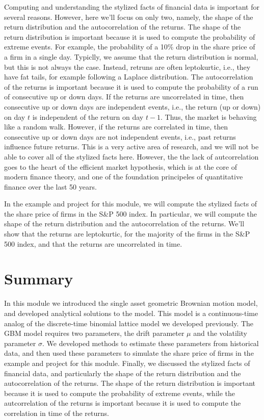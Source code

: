 \documentclass[11pt]{article}
\theoremstyle{definition}
\begin{document}
Computing and understanding the stylized facts of financial data is important for several reasons. 
However, here we'll focus on only two, namely, the shape of the return distribution and the autocorrelation of the returns.
The shape of the return distribution is important because it is used to compute the probability of extreme events.
For example, the probability of a 10\% drop in the share price of a firm in a single day. 
Typiclly, we assume that the return distribution is normal, but this is not always the case. 
Instead, retruns are often leptokurtic, i.e., they have fat tails, for example following a Laplace distribution.
The autocorrelation of the returns is important because it is used to compute the probability of a run of consecutive up or down days.
If the returns are uncorrelated in time, then consecutive up or down days are independent events, i.e., 
the return (up or down) on day $t$ is independent of the return on day $t-1$. Thus, the market is behaving like a random walk.
However, if the returns are correlated in time, then consecutive up or down days are not independent events, i.e., 
past returns influence future returns. This is a very active area of research, and we will not be able to cover all of the stylized facts here. However, the 
the lack of autcorrelation goes to the heart of the efficient market hypothesis, which is at the core of modern finance theory, 
and one of the foundation principeles of quantitative finance over the last 50 years.

In the example and project for this module, we will compute the stylized facts of the share price of firms in the S\&P 500 index.
In particular, we will compute the shape of the return distribution and the autocorrelation of the returns. 
We'll show that the returns are leptokurtic, for the majority of the firms in the S\&P 500 index, and that the returns are uncorrelated in time.


\section*{Summary}
In this module we introduced the single asset geometric Brownian motion model, and developed analytical solutions to the model.
This model is a continuous-time analog of the discrete-time binomial lattice model we developed previously.
The GBM model requires two parameters, the drift parameter $\mu$ and the volatility parameter $\sigma$. 
We developed methods to estimate these parameters from historical data, 
and then used these parameters to simulate the share price of firms in the example and project for this module.
Finally, we discussed the stylized facts of financial data, and particularly the shape of the return distribution and the autocorrelation of the returns.
The shape of the return distribution is important because it is used to compute the probability of extreme events, 
while the autcorrelation of the returns is important because it is used to compute the correlation in time of the returns. 



\clearpage
\printindex
\end{document}
